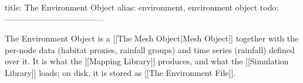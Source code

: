title: The Environment Object
alias: environment, environment object
todo:
------------------------------------

The Environment Object is a [[The Mesh Object|Mesh Object]] together with the per-node data (habitat proxies, rainfall groups) and time series (rainfall) defined over it. It is what the [[Mapping Library]] produces, and what the [[Simulation Library]] loads; on disk, it is stored as [[The Environment File]].
